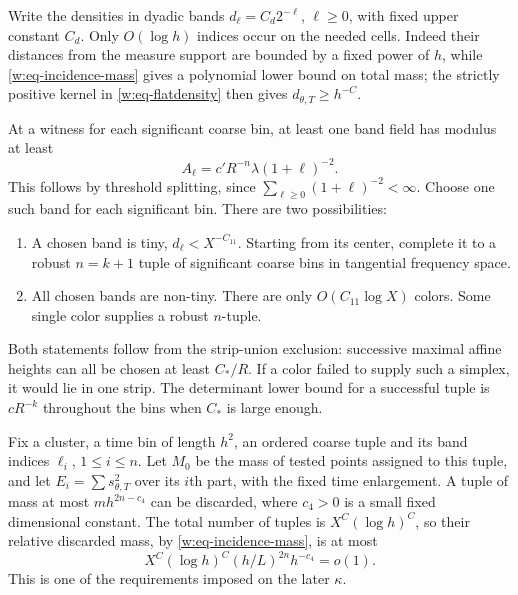 Write the densities in dyadic bands $d_\ell=C_d2^{-\ell}$,
$\ell\geq0$, with fixed upper constant $C_d$.  Only $O(\log h)$
indices occur on the needed cells.  Indeed their distances from the
measure support are bounded by a fixed power of $h$, while
\eqref{w:eq-incidence-mass} gives a polynomial lower bound on total
mass; the strictly positive kernel in \eqref{w:eq-flatdensity} then
gives $d_{\theta,T}\geq h^{-C}$.

At a witness for each significant coarse bin, at least one band field
has modulus at least
\begin{equation}\label{w:eq-bandlevel}
 A_\ell=c'R^{-n}\lambda(1+\ell)^{-2}.
\end{equation}
This follows by threshold splitting, since
$\sum_{\ell\geq0}(1+\ell)^{-2}<\infty$.  Choose one such band for
each significant bin.  There are two possibilities:
\begin{enumerate}[label=\textup{(\roman*)}]
\item A chosen band is tiny, $d_\ell<X^{-C_{11}}$.  Starting from its
center, complete it to a robust $n=k+1$ tuple of significant coarse
bins in tangential frequency space.
\item All chosen bands are non-tiny.  There are only $O(C_{11}\log X)$
colors.  Some single color supplies a robust $n$-tuple.
\end{enumerate}
Both statements follow from the strip-union exclusion: successive
maximal affine heights can all be chosen at least $C_*/R$.  If a color
failed to supply such a simplex, it would lie in one strip.  The
determinant lower bound for a successful tuple is $cR^{-k}$ throughout
the bins when $C_*$ is large enough.

Fix a cluster, a time bin of length $h^2$, an ordered coarse tuple and
its band indices $\ell_i$, $1\leq i\leq n$.  Let $M_0$ be the mass
of tested points assigned to this tuple, and let
$E_i=\sum s_{\theta,T}^2$ over its $i$th part, with the fixed time
enlargement.  A tuple of mass at most $mh^{2n-c_4}$ can be discarded,
where $c_4>0$ is a small fixed dimensional constant.  The total number
of tuples is $X^C(\log h)^C$, so their relative discarded mass, by
\eqref{w:eq-incidence-mass}, is at most
\[
 X^C(\log h)^C(h/L)^{2n}h^{-c_4}=o(1).
\]
This is one of the requirements imposed on the later $\kappa$.

